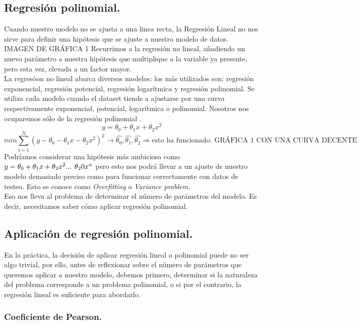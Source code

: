 \documentclass[a4paper,10pt]{article}
\begin{document}
\subsection{Regresión polinomial.}

Cuando nuestro modelo no se ajusta a una linea recta, la Regresión Lineal no nos sirve para definir una hipótesis que se ajuste a nuestro modelo de datos.
IMAGEN DE GRÁFICA 1
Recurrimos a la regresión no lineal, añadiendo un nuevo parámetro a nuestra hipótesis que multiplique a la variable ya presente, pero esta vez, elevada a un factor mayor.\\
La regresóon no lineal abarca diversos modelos: los más utilizados son: regresión exponencial, regresión potencial, regresión logarítmica y regresión polinomial. Se utiliza cada modelo cuando el dataset tiende a ajustarse por una curva
respectivamente exponencial, potencial, logarítmica o polinomial. Nosotros nos
ocuparemos sólo de la regresión polinomial .
\[
 y=\theta_0+\theta_1 x+\theta_2 x^2
\]
\[
 min\sum_{i=1}^{N}(y-\theta_0-\theta_1 x-\theta_2 x^2)^2\longrightarrow \hat{\theta_0},\hat{\theta_1},\hat{\theta_2} \Rightarrow \text{esto ha funcionado. GRÁFICA 1 CON UNA CURVA DECENTE}
\] 
Podríamos considerar una hipótesis más ambiciosa como $y=\theta_0+\theta_1 x+\theta_2 x^2 ...\hspace{0.15cm} \theta_20 x^n$ pero esto nos podrá llevar a un ajuste de nuestro modelo demasiado preciso como para funcionar correctamente con datos de testeo. Esto se conoce como \textit{Overfitting} o \textit{Variance problem}.
\\Eso nos lleva al problema de determinar el número de parámetros del modelo. Es decir, necesitamos saber cómo aplicar regresión polinomial.
\subsection{Aplicación de regresión polinomial.}

En la práctica, la decisión de aplicar regresión lineal o polinomial puede no ser algo trivial, por ello, antes de reflexionar sobre el número de parámetros que queremos aplicar a nuestro modelo, debemos primero, determinar si la naturaleza del problema corresponde a un problema polinomial, o si por el contrario, la regresión lineal es suficiente para abordarlo.
\subsubsection{Coeficiente de Pearson.}
\end{document}
